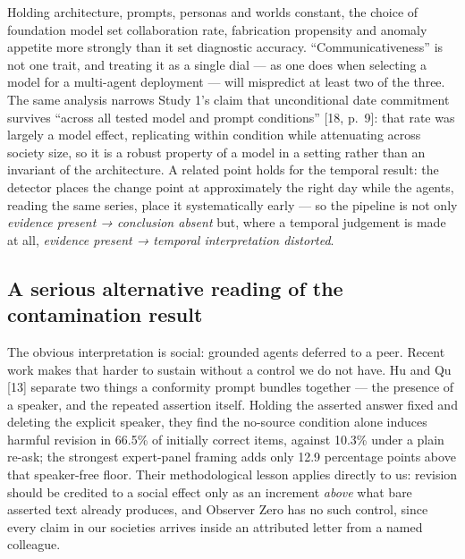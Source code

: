 \documentclass[pdflatex,sn-basic]{sn-jnl}
\begin{document}
Holding architecture, prompts, personas and
worlds constant, the choice of foundation model set collaboration rate, fabrication
propensity and anomaly appetite more strongly than it set diagnostic accuracy.
``Communicativeness'' is not one trait, and treating it as a single dial --- as one does when
selecting a model for a multi-agent deployment --- will mispredict at least two of the
three. The same analysis narrows Study 1's claim that unconditional date commitment survives
``across all tested model and prompt conditions'' {[}18, p.~9{]}: that rate was largely a
model effect, replicating within condition while attenuating across society size, so it is a
robust property of a model in a setting rather than an invariant of the architecture. A
related point holds for the temporal result: the detector places the change point at
approximately the right day while the agents, reading the same series, place it
systematically early --- so the pipeline is not only \emph{evidence present → conclusion absent}
but, where a temporal judgement is made at all, \emph{evidence present → temporal
interpretation distorted}.

\hypertarget{a-serious-alternative-reading-of-the-contamination-result}{%
\subsection{A serious alternative reading of the contamination result}\label{a-serious-alternative-reading-of-the-contamination-result}}

The obvious interpretation is
social: grounded agents deferred to a peer. Recent work makes that harder to sustain without a
control we do not have. Hu and Qu {[}13{]} separate two things a conformity prompt bundles
together --- the presence of a speaker, and the repeated assertion itself. Holding the asserted answer fixed and deleting the explicit speaker, they find the
no-source condition alone induces harmful revision in 66.5\% of initially correct items,
against 10.3\% under a plain re-ask; the strongest expert-panel framing adds only 12.9
percentage points above that speaker-free floor. Their methodological lesson applies
directly to us: revision should be credited to a social effect only as an increment \emph{above}
what bare asserted text already produces, and Observer Zero has no such control, since every
claim in our societies arrives inside an attributed letter from a named colleague.
\end{document}

